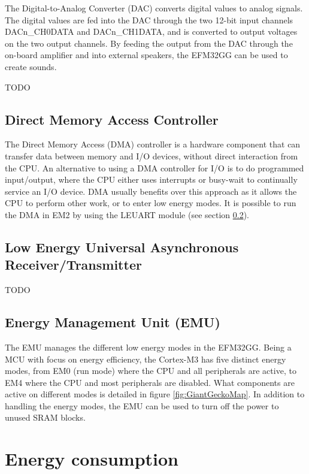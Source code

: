 The Digital-to-Analog Converter (DAC) converts digital values to analog signals. The digital values are fed into the DAC through the two 12-bit input channels DACn\_CH0DATA and DACn\_CH1DATA, and is converted to output voltages on the two output channels. By feeding the output from the DAC through the on-board amplifier and into external speakers, the EFM32GG can be used to create sounds.

TODO %

\subsection{Direct Memory Access Controller}
The Direct Memory Access (DMA) controller is a hardware component that can transfer data between memory and I/O devices, without direct interaction from the CPU. An alternative to using a DMA controller for I/O is to do programmed input/output, where the CPU either uses interrupts or busy-wait to continually service an I/O device. DMA usually benefits over this approach as it allows the CPU to perform other work, or to enter low energy modes. It is possible to run the DMA in EM2 by using the LEUART module (see section \ref{subsec:leuart}).

\subsection{Low Energy Universal Asynchronous Receiver/Transmitter}\label{subsec:leuart}
TODO %

\subsection{Energy Management Unit (EMU)}\label{subsec:emu}
The EMU manages the different low energy modes in the EFM32GG. Being a MCU with focus on energy efficiency, the Cortex-M3 has five distinct energy modes, from EM0 (run mode) where the CPU and all peripherals are active, to EM4 where the CPU and most peripherals are disabled. What components are active on different modes is detailed in figure \ref{fig:GiantGeckoMap}. In addition to handling the energy modes, the EMU can be used to turn off the power to unused SRAM blocks.\cite{efm32gg-rm}


\section{Energy consumption}

